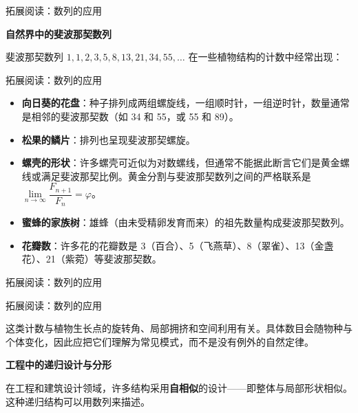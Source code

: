 \documentclass[aspectratio=169,10pt,fontset=fandol]{ctexbeamer}
\begin{document}
\begin{frame}[t,fragile]{拓展阅读：数列的应用}
\normalsize
{\normalsize
\textbf{自然界中的斐波那契数列}


}
{\normalsize
斐波那契数列 \(1, 1, 2, 3, 5, 8, 13, 21, 34, 55, \ldots\) 在一些植物结构的计数中经常出现：


}
\end{frame}
\begin{frame}[t,fragile]{拓展阅读：数列的应用}
\normalsize
{\normalsize
\begin{itemize}
\item \textbf{向日葵的花盘}：种子排列成两组螺旋线，一组顺时针，一组逆时针，数量通常是相邻的斐波那契数（如 34 和 55，或 55 和 89）。
\item \textbf{松果的鳞片}：排列也呈现斐波那契螺旋。
\item \textbf{螺壳的形状}：许多螺壳可近似为对数螺线，但通常不能据此断言它们是黄金螺线或满足斐波那契比例。黄金分割与斐波那契数列之间的严格联系是 \(\lim\limits_{n \to \infty} \dfrac{F_{n+1}}{F_n}=\varphi\)。
\item \textbf{蜜蜂的家族树}：雄蜂（由未受精卵发育而来）的祖先数量构成斐波那契数列。
\item \textbf{花瓣数}：许多花的花瓣数是 3（百合）、5（飞燕草）、8（翠雀）、13（金盏花）、21（紫菀）等斐波那契数。
\end{itemize}
}
\end{frame}
\begin{frame}[t,fragile]{拓展阅读：数列的应用}
\normalsize
{\normalsize
\begin{center}
\end{center}
}
\end{frame}
\begin{frame}[t,fragile]{拓展阅读：数列的应用}
\normalsize
{\normalsize
这类计数与植物生长点的旋转角、局部拥挤和空间利用有关。具体数目会随物种与个体变化，因此应把它们理解为常见模式，而不是没有例外的自然定律。


}
{\normalsize

\textbf{工程中的递归设计与分形}


}
{\normalsize
在工程和建筑设计领域，许多结构采用\textbf{自相似}的设计——即整体与局部形状相似。这种递归结构可以用数列来描述。


}
\end{frame}
\end{document}
